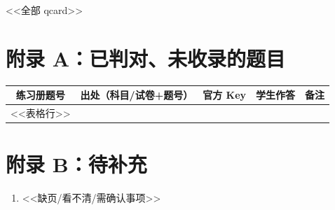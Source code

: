 \documentclass[10.5pt]{article}
\renewcommand{\arraystretch}{1.18}
\begin{document}
<<全部 qcard>>

\clearpage
\section*{附录 A：已判对、未收录的题目}
\begin{center}
\renewcommand{\arraystretch}{1.35}
\begin{tabular}{cllcl}
\toprule
练习册题号 & 出处（科目/试卷+题号） & 官方 Key & 学生作答 & 备注 \\
\midrule
<<表格行>>
\bottomrule
\end{tabular}
\end{center}

\vspace{4mm}
\section*{附录 B：待补充}
\begin{enumerate}
  \item <<缺页/看不清/需确认事项>>
\end{enumerate}
\end{document}
